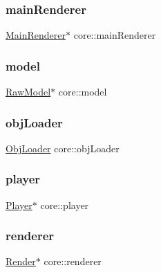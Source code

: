 \mbox{\label{namespacecore_a01adfda2bbace85dc243e5fba0d93b52}} 
\subsubsection{\texorpdfstring{main\+Renderer}{mainRenderer}}
{\footnotesize\ttfamily \hyperlink{classcore_1_1MainRenderer}{Main\+Renderer}$\ast$ core\+::main\+Renderer}

\mbox{\label{namespacecore_aa1479d4ed4dadbfe085b26662122b68a}} 
\subsubsection{\texorpdfstring{model}{model}}
{\footnotesize\ttfamily \hyperlink{classmodel_1_1RawModel}{Raw\+Model}$\ast$ core\+::model}

\mbox{\label{namespacecore_abf1a2ebbee224aa2f7a35148ebcac1fb}} 
\subsubsection{\texorpdfstring{obj\+Loader}{objLoader}}
{\footnotesize\ttfamily \hyperlink{classcore_1_1ObjLoader}{Obj\+Loader} core\+::obj\+Loader}

\mbox{\label{namespacecore_a8130d7cf3bb04bc517651bc3855f8c0f}} 
\subsubsection{\texorpdfstring{player}{player}}
{\footnotesize\ttfamily \hyperlink{classentity_1_1Player}{Player}$\ast$ core\+::player}

\mbox{\label{namespacecore_a4f2740ccbefd3bb34c624a8c99d6446d}} 
\subsubsection{\texorpdfstring{renderer}{renderer}}
{\footnotesize\ttfamily \hyperlink{classcore_1_1Render}{Render}$\ast$ core\+::renderer}

